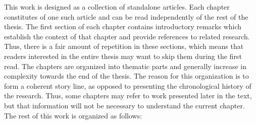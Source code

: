 This work is designed as a collection of standalone articles. Each chapter
constitutes of one such article and can be read independently of the rest of the
thesis. The first section of each chapter contains introductory remarks which
establish the context of that chapter and provide references to related
research. Thus, there is a fair amount of repetition in these sections, which
means that readers interested in the entire thesis may want to skip them during
the first read. The chapters are organized into thematic parts and generally
increase in complexity towards the end of the thesis. The reason for this
organization is to form a coherent story line, as opposed to presenting the
chronological history of the research. Thus, some chapters may refer to work
presented later in the text, but that information will not be necessary to
understand the current chapter. The rest of this work is organized as follows:
